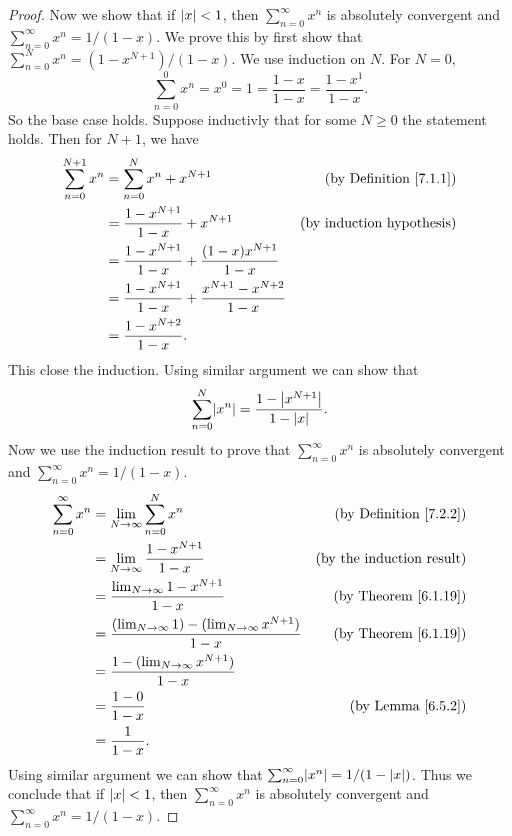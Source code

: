 \begin{proof}
Now we show that if \(\abs*{x} < 1\), then \(\sum_{n = 0}^\infty x^n\) is absolutely convergent and \(\sum_{n = 0}^\infty x^n = 1 / (1 - x)\).
We prove this by first show that \(\sum_{n = 0}^N x^n = (1 - x^{N + 1}) / (1 - x)\).
We use induction on \(N\).
For \(N = 0\),
\[
    \sum_{n = 0}^0 x^n = x^0 = 1 = \frac{1 - x}{1 - x} = \frac{1 - x^1}{1 - x}.
\]
So the base case holds.
Suppose inductivly that for some \(N \geq 0\) the statement holds.
Then for \(N + 1\), we have
\begin{align*}
\sum_{n = 0}^{N + 1} x^n &= \sum_{n = 0}^N x^n + x^{N + 1} & \text{(by Definition \ref{7.1.1})} \\
&= \frac{1 - x^{N + 1}}{1 - x} + x^{N + 1} & \text{(by induction hypothesis)} \\
&= \frac{1 - x^{N + 1}}{1 - x} + \frac{(1 - x) x^{N + 1}}{1 - x} \\
&= \frac{1 - x^{N + 1}}{1 - x} + \frac{x^{N + 1} - x^{N + 2}}{1 - x} \\
&= \frac{1 - x^{N + 2}}{1 - x}.
\end{align*}
This close the induction.
Using similar argument we can show that
\[
    \sum_{n = 0}^N \abs*{x^n} = \frac{1 - \abs*{x^{N + 1}}}{1 - \abs*{x}}.
\]
Now we use the induction result to prove that \(\sum_{n = 0}^\infty x^n\) is absolutely convergent and \(\sum_{n = 0}^\infty x^n = 1 / (1 - x)\).
\begin{align*}
\sum_{n = 0}^\infty x^n &= \lim_{N \to \infty} \sum_{n = 0}^N x^n & \text{(by Definition \ref{7.2.2})} \\
&= \lim_{N \to \infty} \frac{1 - x^{N + 1}}{1 - x} & \text{(by the induction result)} \\
&= \frac{\lim_{N \to \infty} 1 - x^{N + 1}}{1 - x} & \text{(by Theorem \ref{6.1.19})} \\
&= \frac{(\lim_{N \to \infty} 1) - (\lim_{N \to \infty} x^{N + 1})}{1 - x} & \text{(by Theorem \ref{6.1.19})} \\
&= \frac{1 - (\lim_{N \to \infty} x^{N + 1})}{1 - x} \\
&= \frac{1 - 0}{1 - x} & \text{(by Lemma \ref{6.5.2})} \\
&= \frac{1}{1 - x}.
\end{align*}
Using similar argument we can show that \(\sum_{n = 0}^\infty \abs*{x^n} = 1 / (1 - \abs*{x})\).
Thus we conclude that if \(\abs*{x} < 1\), then \(\sum_{n = 0}^\infty x^n\) is absolutely convergent and \(\sum_{n = 0}^\infty x^n = 1 / (1 - x)\).
\end{proof}

